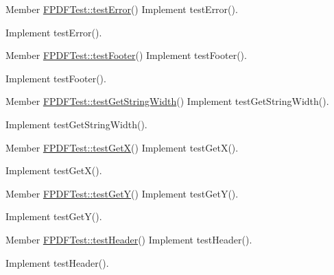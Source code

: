 \begin{DoxyDescription}
\item[Member \hyperlink{class_f_p_d_f_test_a3e018a623c05ac45934f76f3a84ef6e5}{FPDFTest::testError}() ]Implement testError().

Implement testError().
\end{DoxyDescription}

\label{todo__todo000170}
\hypertarget{todo__todo000170}{}
 
\begin{DoxyDescription}
\item[Member \hyperlink{class_f_p_d_f_test_ab59f9affc99c4a139bb4a2a59eb671a6}{FPDFTest::testFooter}() ]Implement testFooter().

Implement testFooter().
\end{DoxyDescription}

\label{todo__todo000175}
\hypertarget{todo__todo000175}{}
 
\begin{DoxyDescription}
\item[Member \hyperlink{class_f_p_d_f_test_ab49ba3bd8551059cea48f2929b32b61a}{FPDFTest::testGetStringWidth}() ]Implement testGetStringWidth().

Implement testGetStringWidth().
\end{DoxyDescription}

\label{todo__todo000192}
\hypertarget{todo__todo000192}{}
 
\begin{DoxyDescription}
\item[Member \hyperlink{class_f_p_d_f_test_a728a3a25024a1c747d2ebe02263d946e}{FPDFTest::testGetX}() ]Implement testGetX().

Implement testGetX().
\end{DoxyDescription}

\label{todo__todo000194}
\hypertarget{todo__todo000194}{}
 
\begin{DoxyDescription}
\item[Member \hyperlink{class_f_p_d_f_test_a202891a4bb198875c2e7d3b942e14cc7}{FPDFTest::testGetY}() ]Implement testGetY().

Implement testGetY().
\end{DoxyDescription}

\label{todo__todo000169}
\hypertarget{todo__todo000169}{}
 
\begin{DoxyDescription}
\item[Member \hyperlink{class_f_p_d_f_test_a19b6fc728e839dc11d0e1a51de611b5e}{FPDFTest::testHeader}() ]Implement testHeader().

Implement testHeader().
\end{DoxyDescription}

